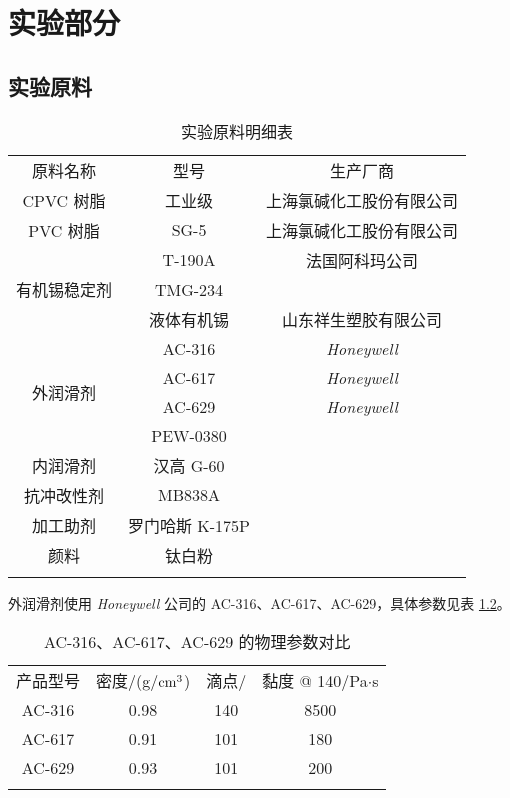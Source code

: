 \chapter{实验部分}

\section{实验原料}

\begin{table}[!htb]
    \caption{实验原料明细表}
    \label{tabRaw}
    \begin{center}
        \begin{tabular}{ccc}
             \Xhline{1pt}
             原料名称 & 型号 & 生产厂商		\\
             \Xhline{0.5pt}
             CPVC 树脂 & 工业级 & 上海氯碱化工股份有限公司	\\
			 PVC 树脂 & SG-5 & 上海氯碱化工股份有限公司		\\
			 \multirow{3}{*}{有机锡稳定剂} & T-190A & 法国阿科玛公司	\\
			 & TMG-234 & \\
			 & 液体有机锡 & 山东祥生塑胶有限公司\\
			 \multirow{4}{*}{外润滑剂} & AC-316 & \textit{Honeywell}	\\
			 & AC-617 & \textit{Honeywell}	\\
			 & AC-629 & \textit{Honeywell}	\\
			 & PEW-0380 &	\\
			 内润滑剂 & 汉高 G-60 &	\\
			 抗冲改性剂 & MB838A &	\\
			 加工助剂 & 罗门哈斯 K-175P &	\\
			 颜料 & 钛白粉 &	\\
             \Xhline{1pt}
        \end{tabular}
    \end{center}
\end{table}

外润滑剂使用 \textit{Honeywell} 公司的 AC-316、AC-617、AC-629，具体参数见表 \ref{tabSmootherHoney}。

\begin{table}[!htb]
	\caption{AC-316、AC-617、AC-629 的物理参数对比}
	\label{tabSmootherHoney}
	\begin{center}
		\begin{tabular}{cccc}
				\Xhline{1pt}
				产品型号 & 密度/(g/$\rm{cm^3}$) & 滴点/\cd & 黏度 @ 140\cd/Pa$\cdot$s   \\
				\Xhline{0.5pt}
				AC-316 & 0.98 & 140 & 8500 \\
				AC-617 & 0.91 & 101 & 180  \\
				AC-629 & 0.93 & 101 & 200  \\
				\Xhline{1pt}
		\end{tabular}
	\end{center}
\end{table}


